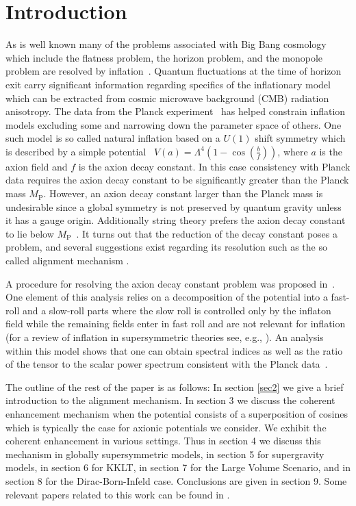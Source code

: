 \documentclass[12pt]{article}
\begin{document}
\section{Introduction \label{sec1}}
As is well known many of the problems associated with Big Bang cosmology which include
the flatness problem, the horizon problem, and the monopole problem are resolved by inflation~\cite{Guth:1980zm,Starobinsky:1980te,Linde:1981mu,Albrecht:1982wi,Sato,Linde:1983gd}.
Quantum fluctuations at the time of horizon exit carry significant information regarding specifics
of the inflationary model~\cite{Mukhanov+,Cheung:2007st}
which can be extracted from cosmic microwave background (CMB) radiation anisotropy.
The data from the Planck experiment~\cite{Adam:2015rua,Ade:2015lrj,Array:2015xqh} has helped
constrain inflation models excluding some and narrowing down the parameter space of others.
One such model is so called natural inflation based on a $U(1)$ shift symmetry
which is described by a simple potential~\cite{Freese:1990rb,Adams:1992bn}
$V(a) = \Lambda^4 \left(1- \cos(\frac{b}{f})\right)$,
where $a$ is the axion field and $f$ is the axion decay constant.
In this case consistency with Planck data requires the axion decay constant to be significantly greater than the Planck mass $M_\text{P}$.
However, an axion decay constant larger than the Planck mass is undesirable since a global symmetry is not preserved by quantum gravity
unless it has a gauge origin. Additionally string theory prefers the axion decay constant to lie below $M_\text{P}$~\cite{Banks:2003sx,Svrcek:2006yi}.
It turns out that the reduction of the decay constant poses a problem, and several suggestions exist regarding its resolution such as the
so called alignment mechanism \cite{Kim:2004rp,Long:2014dta}.

A procedure for resolving the axion decay constant problem was proposed in~\cite{Nath:2017ihp}.
One element of this analysis relies on a
decomposition of the potential into a fast-roll and a slow-roll parts where the slow roll is controlled only by the inflaton field while the remaining fields enter in fast roll and are not relevant for
inflation~\cite{Nath:2017ihp} (for a review of inflation in supersymmetric theories see, e.g., \cite{Nath:2016qzm}).
An analysis within this model shows that one can obtain
spectral indices as well as the ratio of the tensor to the scalar power spectrum consistent with the Planck data~\cite{Adam:2015rua,Ade:2015lrj,Array:2015xqh}.

The outline of the rest of the paper is as follows: In section \ref{sec2} we give a brief introduction to the alignment mechanism. In section 3
we discuss the coherent enhancement mechanism when the potential consists of a superposition of cosines which is typically the case
for axionic potentials we consider. We exhibit the coherent enhancement in various settings. Thus in section 4 we discuss this mechanism
in globally supersymmetric models, in section 5 for supergravity models, in section 6 for KKLT, in section 7 for the Large Volume
Scenario, and in section 8 for the Dirac-Born-Infeld case. Conclusions are given in section 9.
Some relevant papers related to this work can be found in  \cite{BlancoPillado:2006he,Conlon:2005jm,Ben-Dayan:2014lca,Gao:2014uha}.
\end{document}
